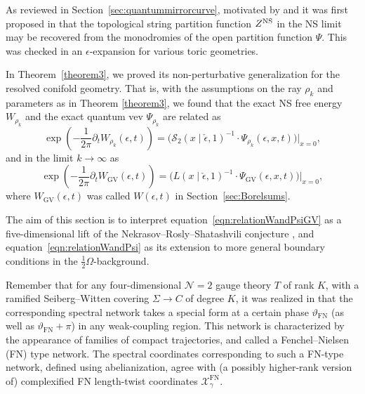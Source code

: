 \documentclass[pdftex]{sigma}
\numberwithin{equation}{section}
\begin{document}
As reviewed in Section~\ref{sec:quantummirrorcurve}, motivated by \cite{ADKMV} and \cite{NS} it was first proposed in \cite{ACDKV} that the topological string partition function $Z^{\rm NS}$ in the NS limit may be recovered from the monodromies of the open partition function $\Psi$. This was checked in an $\epsilon$-expansion for various toric geometries.

In Theorem~\ref{theorem3}, we proved its non-perturbative generalization for the resolved conifold geometry. That is, with the assumptions on the ray $\rho_k$ and parameters as in Theorem \ref{theorem3}, we found that the exact NS free energy $W_{\rho_k}$ and the exact quantum vev $\Psi_{\rho_k}$ are related as
\begin{equation}\label{eqn:relationWandPsi}
 \exp\left(-\frac{1}{2\pi}\partial_tW_{\rho_k}(\epsilon,t)\right)=\big(\mathcal{S}_2(x\mid \check\epsilon,1)^{-1}\cdot \Psi_{\rho_k}(\epsilon,x,t)\big)\big|_{x=0},
\end{equation}
and in the limit $k \to \infty$ as
\begin{equation}\label{eqn:relationWandPsiGV}
 \exp\left(-\frac{1}{2\pi}\partial_t W_{\mathrm{GV}}(\epsilon,t)\right)=\big(L(x\mid \check\epsilon,1)^{-1}\cdot \Psi_{\mathrm{GV}}(\epsilon,x,t)\big)\big|_{x=0},
\end{equation}
where $W_{\mathrm{GV}}(\epsilon,t)$ was called $W(\epsilon,t)$ in Section~\ref{sec:Borelsums}.

The aim of this section is to interpret equation~\eqref{eqn:relationWandPsiGV} as a five-dimensional lift of the Nekrasov--Rosly--Shatashvili conjecture \cite{Nekrasov:NRS}, and equation~\eqref{eqn:relationWandPsi} as its extension to more general boundary conditions in the $\frac{1}{2}\Omega$-background.

Remember that for any four-dimensional $\mathcal{N}=2$ gauge theory $T$ of rank $K$, with a ramified Seiberg--Witten covering $\Sigma \to C$ of degree $K$, it was realized in \cite{Hollands:Heun, Hollands:2013qza} that the corresponding spectral network takes a special form at a certain phase $\vartheta_{\mathrm{FN}}$ (as well as $\vartheta_{\mathrm{FN}}+\pi$) in any weak-coupling region. This network is characterized by the appearance of families of compact trajectories, and called a Fenchel--Nielsen (FN) type network. The spectral coordinates corresponding to such a FN-type network, defined using abelianization, agree with (a possibly higher-rank version of) complexified FN length-twist coordinates $\mathcal{X}_\gamma^{\mathrm{FN}}$.
\end{document}
